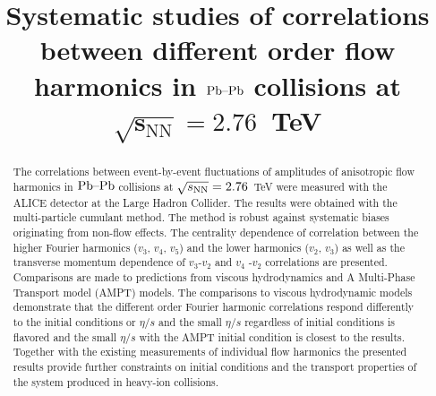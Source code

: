 \documentclass[ALICE,manyauthors]{cernphprep}
\begin{document}
%
%

\newcommand{\PbPb}{\textnormal{Pb--Pb}}
\newcommand{\AuAu}{\textnormal{Au--Au}}
\newcommand{\pp}{\ensuremath{\mbox{p}\mbox{p}}}
\newcommand{\snn}{\ensuremath{\sqrt{s_\tn{NN}}}}
\newcommand{\pt}{\ensuremath{p_\tn{T}}}\newcommand{\pT}{\pt}
\newcommand{\CKBNOTE}[1]{{\bf CKB:  #1}} 
\renewcommand{\CKBNOTE}[1]{}  %

\newcommand{\RHNOTE}[1]{{\bf RH:  #1}} 
\renewcommand{\RHNOTE}[1]{}  %

\begin{titlepage}
%
%
%
\title{Systematic studies of correlations between different order flow harmonics in $\PbPb$ collisions at $\mathbf{\sqrt{s_\mathrm{NN}} = 2.76}$~TeV}

%
%
\begin{abstract}

The correlations between event-by-event fluctuations of amplitudes of anisotropic flow harmonics
in $\PbPb$ collisions at $\snn=2.76$~TeV were measured with the ALICE detector at the Large Hadron Collider. 
The results were obtained with the multi-particle cumulant method.
The method is robust against systematic biases originating from non-flow effects. 
The centrality dependence of correlation between the higher Fourier harmonics ($v_3$, $v_4$, $v_5$) and the lower harmonics ($v_2$, $v_3$) as well as the transverse momentum dependence of $v_3$-$v_2$ and $v_4$ -$v_2$ correlations are presented. 
Comparisons are made to predictions from viscous hydrodynamics and  A Multi-Phase Transport model  ({AMPT}) models.
The comparisons to viscous hydrodynamic models demonstrate that
the different order Fourier harmonic correlations respond differently to the initial conditions or $\eta/s$ and the small $\eta/s$ regardless of initial conditions is flavored and the small $\eta/s$ with the AMPT initial condition is closest to the results. 
Together with the existing measurements of individual flow harmonics the presented results provide further constraints 
on initial conditions and the transport properties of the system produced in heavy-ion collisions.
\end{abstract}
\end{titlepage}
\setcounter{page}{2}
\end{document}
